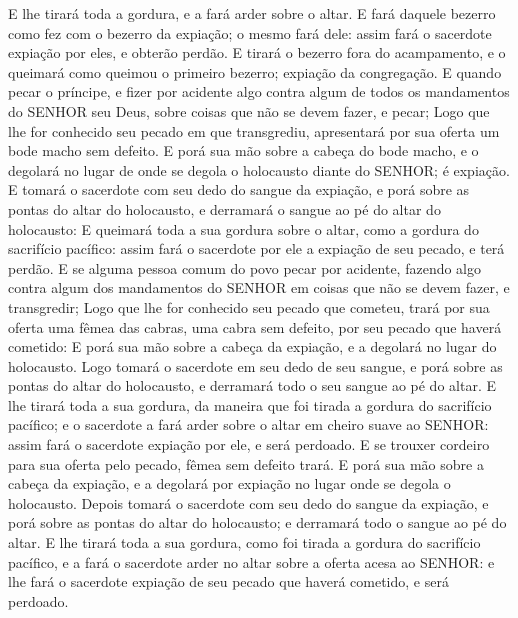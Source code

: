 {E lhe tirará toda a gordura, e a fará arder sobre o altar.
E fará daquele bezerro como fez com o bezerro da expiação; o mesmo fará dele: assim fará o sacerdote expiação por eles, e obterão perdão.
E tirará o bezerro fora do acampamento, e o queimará como queimou o primeiro bezerro; expiação da congregação.
E quando pecar o príncipe, e fizer por acidente algo contra algum de todos os mandamentos do SENHOR seu Deus, sobre coisas que não se devem fazer, e pecar;
Logo que lhe for conhecido seu pecado em que transgrediu, apresentará por sua oferta um bode macho sem defeito.
E porá sua mão sobre a cabeça do bode macho, e o degolará no lugar de onde se degola o holocausto diante do SENHOR; é expiação.
E tomará o sacerdote com seu dedo do sangue da expiação, e porá sobre as pontas do altar do holocausto, e derramará o sangue ao pé do altar do holocausto:
E queimará toda a sua gordura sobre o altar, como a gordura do sacrifício pacífico: assim fará o sacerdote por ele a expiação de seu pecado, e terá perdão.
E se alguma pessoa comum do povo pecar por acidente, fazendo algo contra algum dos mandamentos do SENHOR em coisas que não se devem fazer, e transgredir;
Logo que lhe for conhecido seu pecado que cometeu, trará por sua oferta uma fêmea das cabras, uma cabra sem defeito, por seu pecado que haverá cometido:
E porá sua mão sobre a cabeça da expiação, e a degolará no lugar do holocausto.
Logo tomará o sacerdote em seu dedo de seu sangue, e porá sobre as pontas do altar do holocausto, e derramará todo o seu sangue ao pé do altar.
E lhe tirará toda a sua gordura, da maneira que foi tirada a gordura do sacrifício pacífico; e o sacerdote a fará arder sobre o altar em cheiro suave ao SENHOR: assim fará o sacerdote expiação por ele, e será perdoado.
E se trouxer cordeiro para sua oferta pelo pecado, fêmea sem defeito trará.
E porá sua mão sobre a cabeça da expiação, e a degolará por expiação no lugar onde se degola o holocausto.
Depois tomará o sacerdote com seu dedo do sangue da expiação, e porá sobre as pontas do altar do holocausto; e derramará todo o sangue ao pé do altar.
E lhe tirará toda a sua gordura, como foi tirada a gordura do sacrifício pacífico, e a fará o sacerdote arder no altar sobre a oferta acesa ao SENHOR: e lhe fará o sacerdote expiação de seu pecado que haverá cometido, e será perdoado.

}
